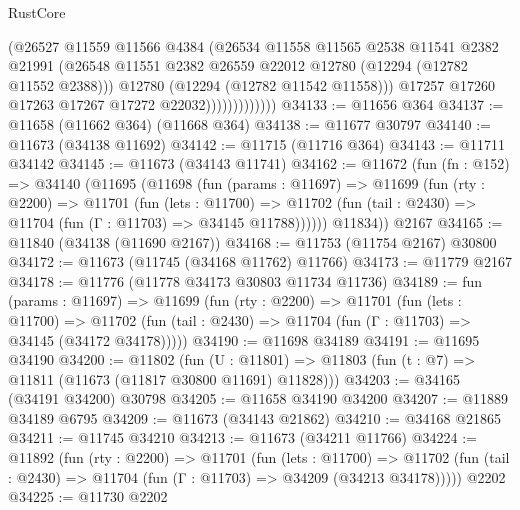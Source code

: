 \begin{lexlean}{RustCore}
\begin{coremodule}
                            (@26527
                              @11559
                              @11566
                              @4384
                              (@26534
                                @11558
                                @11565
                                @2538
                                @11541
                                @2382
                                @21991
                                (@26548
                                  @11551
                                  @2382
                                  @26559
                                  @22012
                                  @12780
                                  (@12294 (@12782 @11552 @2388)))
                                @12780
                                (@12294 (@12782 @11542 @11558)))
                              @17257
                              @17260
                              @17263
                              @17267
                              @17272
                              @22032)))))))))))))
@34133 := @11656 @364
@34137 := @11658 (@11662 @364) (@11668 @364)
@34138 := @11677 @30797
@34140 := @11673 (@34138 @11692)
@34142 := @11715 (@11716 @364)
@34143 := @11711 @34142
@34145 := @11673 (@34143 @11741)
@34162 := @11672
    (fun (fn : @152) =>
    @34140
      (@11695
        (@11698
          (fun (params : @11697) =>
          @11699
            (fun (rty : @2200) =>
            @11701
              (fun (lets : @11700) =>
              @11702 (fun (tail : @2430) => @11704 (fun (Γ : @11703) => @34145 @11788))))))
        @11834))
    @2167
@34165 := @11840 (@34138 (@11690 @2167))
@34168 := @11753 (@11754 @2167) @30800
@34172 := @11673 (@11745 (@34168 @11762) @11766)
@34173 := @11779 @2167
@34178 := @11776 (@11778 @34173 @30803 @11734 @11736)
@34189 := fun (params : @11697) =>
  @11699
    (fun (rty : @2200) =>
    @11701
      (fun (lets : @11700) =>
      @11702 (fun (tail : @2430) => @11704 (fun (Γ : @11703) => @34145 (@34172 @34178)))))
@34190 := @11698 @34189
@34191 := @11695 @34190
@34200 := @11802
    (fun (U : @11801) => @11803 (fun (t : @7) => @11811 (@11673 (@11817 @30800 @11691) @11828)))
@34203 := @34165 (@34191 @34200) @30798
@34205 := @11658 @34190 @34200
@34207 := @11889 @34189 @6795
@34209 := @11673 (@34143 @21862)
@34210 := @34168 @21865
@34211 := @11745 @34210
@34213 := @11673 (@34211 @11766)
@34224 := @11892
    (fun (rty : @2200) =>
    @11701
      (fun (lets : @11700) =>
      @11702 (fun (tail : @2430) => @11704 (fun (Γ : @11703) => @34209 (@34213 @34178)))))
    @2202
@34225 := @11730 @2202

\end{coremodule}
\end{lexlean}
